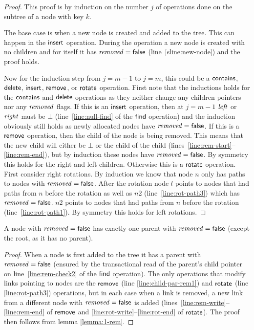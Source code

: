 \begin{proof}
This proof is by induction on the number $j$ of operations done on the subtree of a node with key $k$.

The base case is when a new node is created and added to the tree.
This can happen in the $\act{insert}$ operation.
During the operation a new node is created with no children and for itself it has $\ms{removed}=\lit{false}$ (line~\ref{sline:new-node}) and the proof holds.

Now for the induction step from $j=m-1$ to $j=m$, this could be a $\act{contains}$, $\act{delete}$, $\act{insert}$, $\act{remove}$, or $\act{rotate}$ operation.
First note that the inductions holds for the $\act{contains}$ and $\act{delete}$ operations as they neither change any children pointers nor any $\ms{removed}$ flags.
If this is an $\act{insert}$ operation, then at $j=m-1$ $\ms{left}$ or $\ms{right}$ must be $\bot$ (line~\ref{line:null-find} of the $\act{find}$ operation) and the induction obviously still holds
as newly allocated nodes have $\ms{removed}=\lit{false}$.
If this is a $\act{remove}$ operation, then the child of the node is being removed.
This means that the new child will either be $\bot$ or the child of the child (lines~\ref{line:rem-start}--\ref{line:rem-end}), 
but by induction these nodes have $\ms{removed}=\lit{false}$.
By symmetry this holds for the right and left children.
Otherwise this is a $\act{rotate}$ operation.
First consider right rotations.
By induction we know that node $n$ only has paths to nodes with $\ms{removed}=\lit{false}$.
After the rotation node $l$ points to nodes that had paths from $n$ before the rotation as well as $n2$ (line~\ref{line:rot-path3}) which has $\ms{removed}=\lit{false}$.
$n2$ points to nodes that had paths from $n$ before the rotation (line~\ref{line:rot-path1}).%
By symmetry this holds for left rotations.
\end{proof}


\begin{lemma}
\label{lemma:false-rem-par}
A node with $\ms{removed}=\lit{false}$ has exactly one parent with $\ms{removed}=\lit{false}$ (except the root, as it has no parent).
\end{lemma}
\begin{proof}
When a node is first added to the tree it has a parent with $\ms{removed}=\lit{false}$ (ensured by the transactional read of the parent's child pointer on
line~\ref{line:rem-check2} of the $\act{find}$ operation).
The only operations that modify links pointing to nodes are the $\act{remove}$ (line \ref{line:child-par-rem1}) and $\act{rotate}$ (line \ref{line:rot-path3}) operations,
but in each case when a link is removed, a new link from a different node with $\ms{removed}=\lit{false}$ is added
(lines~\ref{line:rem-write}--\ref{line:rem-end} of $\act{remove}$ and \ref{line:rot-write}--\ref{line:rot-end} of $\act{rotate}$).
The proof then follows from lemma \ref{lemma:1-rem}.
\end{proof}



